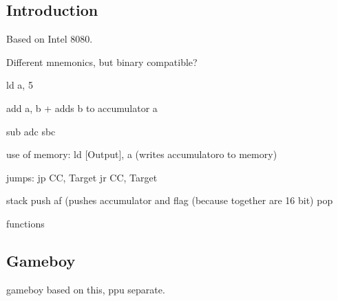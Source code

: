 
\subsection{Introduction}

Based on Intel 8080.

Different mnemonics, but binary compatible?


ld a, 5

add a, b
+ adds b to accumulator a

sub
adc
sbc

use of memory:
ld [Output], a (writes accumulatoro to memory)


jumps:
jp CC, Target
jr CC, Target

stack
push af (pushes accumulator and flag (because together are 16 bit)
pop

functions

\subsection{Gameboy}
gameboy based on this, ppu separate.
